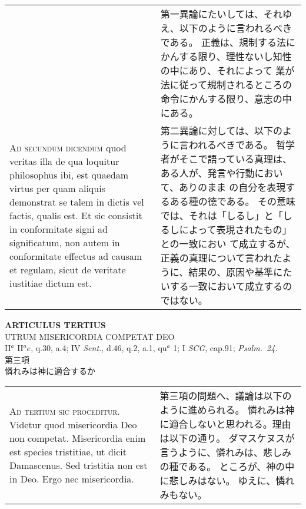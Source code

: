 \documentclass[10pt]{jsarticle} %
\begin{document}
{\begin{longtable}{p{21em}p{21em}}
&

第一異論にたいしては、それゆえ、以下のように言われるべきである。
正義は、規制する法にかんする限り、理性ないし知性の中にあり、それによって
 業が法に従って規制されるところの命令にかんする限り、意志の中にある。


\\


{\scshape Ad secundum dicendum} quod veritas illa de qua
loquitur philosophus ibi, est quaedam virtus per quam aliquis demonstrat
se talem in dictis vel factis, qualis est. Et sic consistit in
conformitate signi ad significatum, non autem in conformitate effectus
ad causam et regulam, sicut de veritate iustitiae dictum est.


&

第二異論に対しては、以下のように言われるべきである。
哲学者がそこで語っている真理は、ある人が、発言や行動において、ありのまま
 の自分を表現するある種の徳である。
その意味では、それは「しるし」と「しるしによって表現されたもの」との一致におい
 て成立するが、正義の真理について言われたように、結果の、原因や基準にた
 いする一致において成立するのではない。


\end{longtable}
\newpage




\begin{center}
 {\Large {\bf ARTICULUS TERTIUS}}\\
 {\large UTRUM MISERICORDIA COMPETAT DEO}\\
 {\footnotesize II$^a$ II$^ae$, q.30, a.4; IV {\itshape Sent.}, d.46,
 q.2, a.1, qu$^a$ 1; I {\itshape SCG}, cap.91; {\itshape Psalm.~24.}}\\
 {\Large 第三項\\憐れみは神に適合するか}
\end{center}

\begin{longtable}{p{21em}p{21em}}

{\Huge A}{\scshape d tertium sic proceditur}. Videtur quod
misericordia Deo non competat. Misericordia enim est species tristitiae,
ut dicit Damascenus. Sed tristitia non est in Deo. Ergo nec
misericordia.


&


第三項の問題へ、議論は以下のように進められる。
憐れみは神に適合しないと思われる。理由は以下の通り。
ダマスケヌスが言うように、憐れみは、悲しみの種である。
ところが、神の中に悲しみはない。
ゆえに、憐れみもない。

\\



\end{longtable}}
\end{document}
